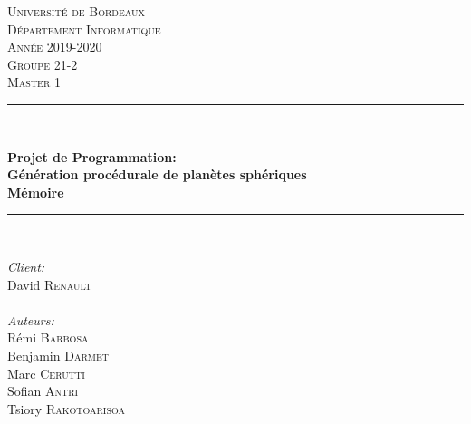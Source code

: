 \documentclass[a4paper]{article}
\begin{document}
\begin{titlepage}
\newcommand{\HRule}{\rule{\linewidth}{0.5mm}} %

\center %
 

\textsc{\LARGE Université de Bordeaux}\\[0.5cm]
\textsc{\large Département Informatique}\\[0.5cm]
\textsc{\large Année 2019-2020}\\[1.5cm]
\textsc{\Large Groupe 21-2}\\[0.2cm] 
\textsc{\large Master 1}\\[0.3cm] 


\HRule \\[0.4cm]
{  \huge \bfseries Projet de Programmation: \\
   \huge \bfseries Génération procédurale de planètes sphériques\\[0.4cm] 
   \Large \bfseries Mémoire
\HRule \\[1.5cm]
 

\begin{minipage}{0.4\textwidth}
\begin{center} \large
\emph{Client:}\\
David \textsc{Renault}\\
~\\
\emph{Auteurs:}\\
Rémi \textsc{Barbosa}\\
Benjamin \textsc{Darmet}\\
Marc \textsc{Cerutti}\\
Sofian \textsc{Antri}\\
Tsiory \textsc{Rakotoarisoa}\\
\end{center}
\end{minipage}
~
}


\end{titlepage}
\end{document}
